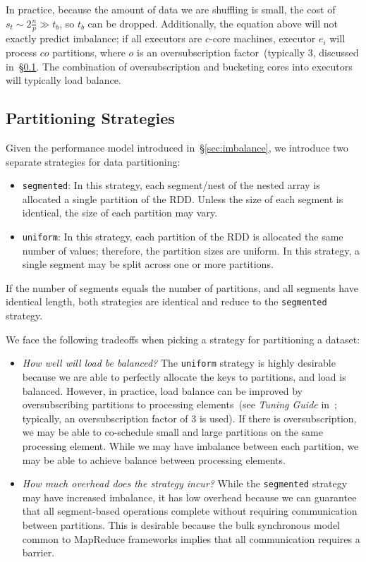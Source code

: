 \documentclass[preprint]{sigplanconf}
\theoremstyle{definition}
\begin{document}
In practice, because the amount of data we are shuffling is small, the cost of $s_t \sim 2 \frac{n}{p} \gg
t_b$, so $t_b$ can be dropped. Additionally, the equation above will not exactly predict imbalance; if
all executors are $c$-core machines, executor $e_i$ will process $c o$ partitions, where $o$ is an
oversubscription factor~(typically 3, discussed in~\S\ref{sec:partitioning-strategies}. The combination of
oversubscription and bucketing cores into executors will typically load balance.

\subsection{Partitioning Strategies}
\label{sec:partitioning-strategies}

Given the performance model introduced in~\S\ref{sec:imbalance}, we introduce two separate strategies
for data partitioning:

\begin{itemize}
\item \texttt{segmented}: In this strategy, each segment/nest of the nested array is allocated a single
partition of the RDD. Unless the size of each segment is identical, the size of each partition may vary.
\item \texttt{uniform}: In this strategy, each partition of the RDD is allocated the same number of
values; therefore, the partition sizes are uniform. In this strategy, a single segment may be split across
one or more partitions.
\end{itemize}

If the number of segments equals the number of partitions, and all segments have identical length,
both strategies are identical and reduce to the \texttt{segmented} strategy.

We face the following tradeoffs when picking a strategy for partitioning a dataset:

\begin{itemize}
\item \emph{How well will load be balanced?} The \texttt{uniform} strategy is highly desirable
because we are able to perfectly allocate the keys to partitions, and load is balanced. However, in
practice, load balance can be improved by oversubscribing partitions to processing elements~(see
\emph{Tuning Guide} in~\cite{spark}; typically, an oversubscription factor of 3 is used). If there is
oversubscription, we may be able to co-schedule small and large partitions on the same processing
element. While we may have imbalance between each partition, we may be able to achieve balance
between processing elements.
\item \emph{How much overhead does the strategy incur?} While the \linebreak \texttt{segmented}
strategy may have increased imbalance, it has low overhead because we can guarantee that all
segment-based operations complete without requiring communication between partitions. This is
desirable because the bulk synchronous model common to MapReduce frameworks implies that all
communication requires a barrier.
\end{itemize}
\end{document}
